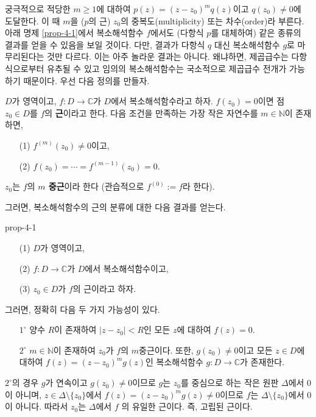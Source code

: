 궁극적으로 적당한 $m\ge1$에 대하여 $p(z) = (z-z_0)^mq(z)$이고  $q(z_0)\ne0$에 도달한다.
이 때 $m$을 ($p$의 근) $z_0$의 중복도(multiplicity) 또는 차수(order)라 부른다.
아래 명제 \ref{prop-4-1}에서 복소해석함수 $f$에서도 (다항식 $p$를 대체하여)
같은 종류의 결과를 얻을 수 있음을 보일 것이다.
다만, 결과가 다항식 $q$ 대신 복소해석함수 $g$로 마무리된다는 것만 다르다.
이는 아주 놀라운 결과는 아니다. 왜냐하면, 제곱급수는 다항식으로부터 유추될 수 있고
임의의 복소해석함수는 국소적으로 제곱급수 전개가 가능하기 때문이다.
우선 다음 정의를 만들자.

\begin{saltdefinition}{}{} \label{def-4-2}
$D$가 영역이고, $f:D\to\mathbb C$가 $D$에서 복소해석함수라고 하자.
$f(z_0)=0$이면 점 $z_0\in D$를 $f$의 {\bf 근}이라고 한다.
다음 조건을 만족하는 가장 작은 자연수를 $m\in\mathbb N$이 존재하면,
\begin{itemize}
\item[(1)] $f^{(m)}(z_0) \ne 0$이고,
\item[(2)] $f(z_0) = \cdots = f^{(m-1)}(z_0) = 0$.
\end{itemize}
$z_0$는 $f$의 {\bf $m$ 중근}이라 한다
(관습적으로 $f^{(0)} := f$라 한다).
\end{saltdefinition}

그러면, 복소해석함수의 근의 분류에 대한 다음 결과를 얻는다.

\begin{saltprop} [근의 분류] {prop-4-1} %
\begin{itemize}
\item[(1)] $D$가 영역이고,
\item[(2)] $f:D\to\mathbb C$가 $D$에서 복소해석함수이고,
\item[(3)] $z_0 \in D$가 $f$의 근이라고 하자.
\end{itemize}
그러면, 정확히 다음 두 가지 가능성이 있다.
\begin{itemize}
\item[$1^\circ$] 양수 $R$이 존재하여 $|z-z_0|<R$인 모든 $z$에 대하여
$f(z)=0$.
\item[$2^\circ$] $m\in\mathbb N$이 존재하여
 $z_0$가 $f$의 $m$중근이다. 또한, 
 $g(z_0)\ne0$이고 모든 $z\in D$에 대하여 $f(z) = (z-z_0)^mg(z)$인
 복소해석함수 $g:D\to\mathbb C$가 존재한다.
\end{itemize}
\end{saltprop}

$2^\circ$의 경우 $g$가 연속이고 $g(z_0)\ne0$이므로
$g$는 $z_0$를 중심으로 하는 작은 원판 $\Delta$에서 $0$이 아니며,
$z\in \Delta\setminus \{z_0\}$에서 $f(z) = (z-z_0)^mg(z) \ne 0$이므로
$f$는 $\Delta\setminus \{z_0\}$에서 $0$이 아니다.
따라서 $z_0$는 $\Delta$에서 $f$ 의 유일한 근이다. 즉, 고립된 근이다.

